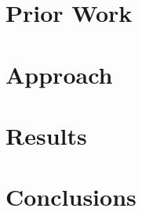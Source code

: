 \documentclass[letterpaper, 10 pt, conference]{ieeeconf}
\begin{document}
\section{Prior Work}
  \label{section:sota}
  

\section{Approach}
  \label{section:the_proposed_method}
  

\section{Results}
  \label{section:results}
  

\section{Conclusions}
  \label{section:finale}
  

\begin{thebibliography}{99}
  
\end{thebibliography}


\balance
\end{document}
